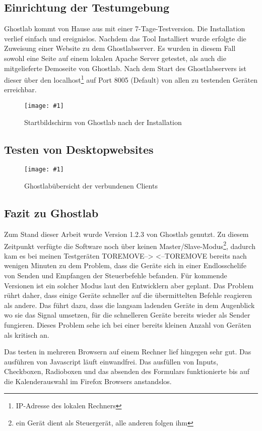 \documentclass[13pt,a4paper,oneside]{scrbook} %
\newcommand{\tr}[1]{TOREMOVE-->\linebreak{#1} \linebreak <--TOREMOVE}
\renewcommand{\\}{\bigskip}
\newcommand{\ig}[3]{
\begin{figure}[htbp]
	\centering
	\texttt{[image: \#1]}%
	\caption[#2]{#3}%
\end{figure}
}
\begin{document}
		\subsection {Einrichtung der Testumgebung}
		Ghostlab kommt von Hause aus mit einer 7-Tage-Testversion. Die Installation verlief einfach und ereignislos. Nachdem das 		Tool Installiert wurde erfolgte die Zuweisung einer Website zu dem Ghostlabserver. Es wurden in diesem Fall sowohl eine 		Seite auf einem lokalen Apache Server getestet, als auch die mitgelieferte Demoseite von Ghostlab. Nach dem Start des 			Ghostlabservers ist dieser über den localhost\footnote{IP-Adresse des lokalen Rechners} auf Port 8005 (Default) von allen zu testenden Geräten erreichbar.
		\ig{../pictures/ghostlab/startbildschirm}{Startbildschirm Ghostlab}{Startbildschirm von Ghostlab nach der Installation}
		
		\subsection{Testen von Desktopwebsites}
		\ig{../pictures/ghostlab/uebersicht_desktop}{Übersicht Desktopbrowser Ghostlab}{Ghostlabübersicht der verbundenen Clients}

		
		
		\pagebreak
		
		\subsection{Fazit zu Ghostlab}
		Zum Stand dieser Arbeit wurde Version 1.2.3 von Ghostlab genutzt. Zu diesem Zeitpunkt verfügte die Software noch über 		keinen Master/Slave-Modus\footnote{ein Gerät dient als Steuergerät, alle anderen folgen ihm}, dadurch kam es bei meinen 		Testgeräten \tr{Geräte spezifizieren} bereits nach wenigen Minuten zu dem Problem, dass die Geräte sich in einer 				Endlosschelife von Senden und Empfangen der Steuerbefehle befanden. Für kommende Versionen ist ein solcher Modus 		laut den Entwicklern aber geplant. Das Problem rührt daher, dass einige Geräte schneller auf die übermittelten Befehle 			reagieren als andere. Das führt dazu, dass die langsam ladenden Geräte in dem Augenblick wo sie das Signal umsetzen, 		für die schnelleren Geräte bereits wieder als Sender fungieren. Dieses Problem sehe ich bei einer bereits kleinen Anzahl 			von Geräten als kritisch an. 

		\\Das testen in mehreren Browsern auf einem Rechner lief hingegen sehr gut. Das ausführen von Javascript läuft 				einwandfrei. Das ausfüllen von Inputs, Checkboxen, Radioboxen und das absenden des Formulars funktionierte bis auf die 		Kalenderauswahl im Firefox Browsers anstandslos.
\end{document}
